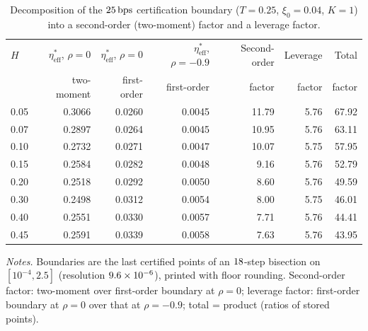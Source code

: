 \begin{table}[!htb]
\centering
\caption{Decomposition of the $25\,\mathrm{bps}$ certification boundary ($T=0.25$, $\xi_0=0.04$, $K=1$) into a second-order (two-moment) factor and a leverage factor.}
\label{tab:s_e2_decomposition}
\footnotesize
\begin{tabular}{@{}lrrrrrr@{}}
\toprule
$H$ & $\eta_{\mathrm{eff}}^{*}$, $\rho=0$ & $\eta_{\mathrm{eff}}^{*}$, $\rho=0$ & $\eta_{\mathrm{eff}}^{*}$, $\rho=-0.9$ & Second-order & Leverage & Total \\
 & two-moment & first-order & first-order & factor & factor & factor \\
\midrule
0.05 & 0.3066 & 0.0260 & 0.0045 & 11.79 & 5.76 & 67.92 \\
0.07 & 0.2897 & 0.0264 & 0.0045 & 10.95 & 5.76 & 63.11 \\
0.10 & 0.2732 & 0.0271 & 0.0047 & 10.07 & 5.75 & 57.95 \\
0.15 & 0.2584 & 0.0282 & 0.0048 & 9.16 & 5.76 & 52.79 \\
0.20 & 0.2518 & 0.0292 & 0.0050 & 8.60 & 5.76 & 49.59 \\
0.30 & 0.2498 & 0.0312 & 0.0054 & 8.00 & 5.75 & 46.01 \\
0.40 & 0.2551 & 0.0330 & 0.0057 & 7.71 & 5.76 & 44.41 \\
0.45 & 0.2591 & 0.0339 & 0.0058 & 7.63 & 5.76 & 43.95 \\
\bottomrule
\end{tabular}
\par\smallskip
\parbox{\linewidth}{\footnotesize\emph{Notes.} Boundaries are the last certified points of an $18$-step bisection on $[10^{-4},2.5]$ (resolution $9.6\times 10^{-6}$), printed with floor rounding. Second-order factor: two-moment over first-order boundary at $\rho=0$; leverage factor: first-order boundary at $\rho=0$ over that at $\rho=-0.9$; total = product (ratios of stored points).}
\end{table}
